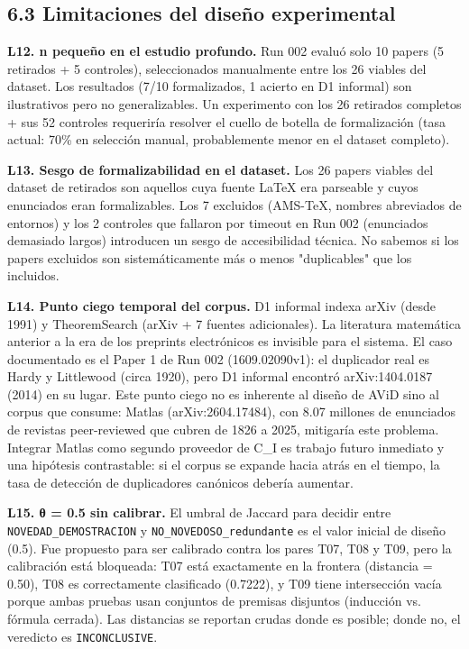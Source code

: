 \documentclass[12pt,a4paper]{article}
\theoremstyle{remark}
\begin{document}
\subsection{6.3 Limitaciones del diseño experimental}

\textbf{L12. n pequeño en el estudio profundo.} Run 002 evaluó solo 10 papers (5 retirados + 5 controles), seleccionados manualmente entre los 26 viables del dataset. Los resultados (7/10 formalizados, 1 acierto en D1 informal) son ilustrativos pero no generalizables. Un experimento con los 26 retirados completos + sus 52 controles requeriría resolver el cuello de botella de formalización (tasa actual: 70\% en selección manual, probablemente menor en el dataset completo).


\textbf{L13. Sesgo de formalizabilidad en el dataset.} Los 26 papers viables del dataset de retirados son aquellos cuya fuente LaTeX era parseable y cuyos enunciados eran formalizables. Los 7 excluidos (AMS-TeX, nombres abreviados de entornos) y los 2 controles que fallaron por timeout en Run 002 (enunciados demasiado largos) introducen un sesgo de accesibilidad técnica. No sabemos si los papers excluidos son sistemáticamente más o menos "duplicables" que los incluidos.


\textbf{L14. Punto ciego temporal del corpus.} D1 informal indexa arXiv (desde 1991) y TheoremSearch (arXiv + 7 fuentes adicionales). La literatura matemática anterior a la era de los preprints electrónicos es invisible para el sistema. El caso documentado es el Paper 1 de Run 002 (1609.02090v1): el duplicador real es Hardy y Littlewood (circa 1920), pero D1 informal encontró arXiv:1404.0187 (2014) en su lugar. Este punto ciego no es inherente al diseño de AViD sino al corpus que consume: Matlas (arXiv:2604.17484), con 8.07 millones de enunciados de revistas peer-reviewed que cubren de 1826 a 2025, mitigaría este problema. Integrar Matlas como segundo proveedor de C\_I es trabajo futuro inmediato y una hipótesis contrastable: si el corpus se expande hacia atrás en el tiempo, la tasa de detección de duplicadores canónicos debería aumentar.


\textbf{L15. θ = 0.5 sin calibrar.} El umbral de Jaccard para decidir entre \texttt{NOVEDAD\_DEMOSTRACION} y \texttt{NO\_NOVEDOSO\_redundante} es el valor inicial de diseño (0.5). Fue propuesto para ser calibrado contra los pares T07, T08 y T09, pero la calibración está bloqueada: T07 está exactamente en la frontera (distancia = 0.50), T08 es correctamente clasificado (0.7222), y T09 tiene intersección vacía porque ambas pruebas usan conjuntos de premisas disjuntos (inducción vs. fórmula cerrada). Las distancias se reportan crudas donde es posible; donde no, el veredicto es \texttt{INCONCLUSIVE}.
\end{document}
